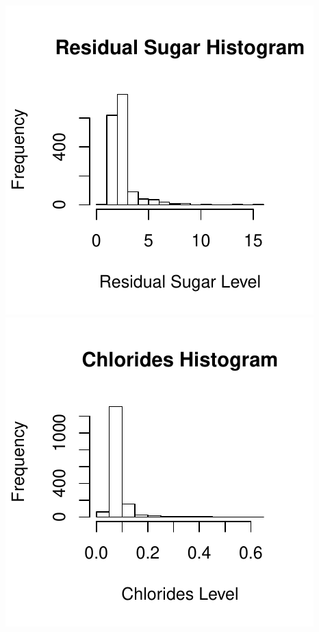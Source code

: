 \documentclass[]{article}
\begin{document}
\includegraphics{Project_files/figure-latex/unnamed-chunk-18-3.pdf}
\includegraphics{Project_files/figure-latex/unnamed-chunk-18-4.pdf}
\end{document}
